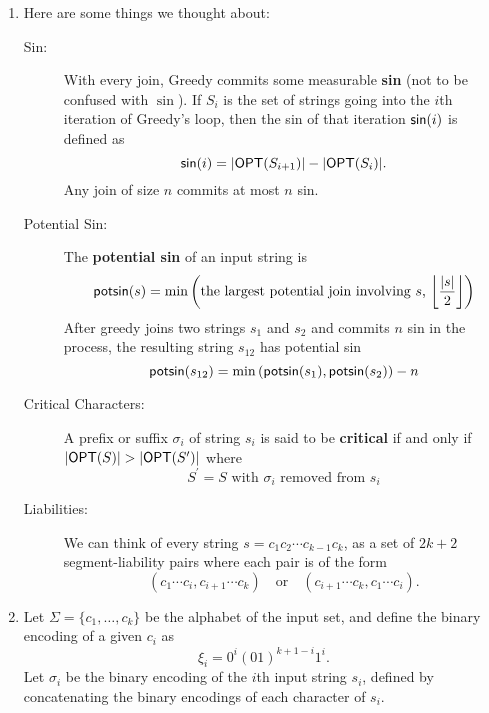 \documentclass{article}
\def\prm{^\prime}
\def\G{{\sf Greedy}\xspace}
\def\O{{\sf OPT}\xspace}
\begin{document}
\begin{enumerate}
\begin{enumerate}
\newpage
\item
Here are some things we thought about:
\begin{description}

\item[Sin:] With every join, \G commits some measurable {\bf sin} (not to be confused with $\sin$). If $S_i$ is the set of strings going into the $i$th iteration of \G's loop, then the sin of that iteration ${\sf sin}(i)$ is defined as
$${\sf sin}(i) = |\O(S_{i+1})| - |\O(S_i)|.$$
Any join of size $n$ commits at most $n$ sin.

\item[Potential Sin:] The {\bf potential sin} of an input string is
$${\sf potsin}(s) = \min\left(\text{the largest potential join involving $s$, $\left\lfloor\frac{|s|}{2}\right\rfloor$}\right)$$
After greedy joins two strings $s_1$ and $s_2$ and commits $n$ sin in the process, the resulting string $s_{12}$ has potential sin
$${\sf potsin}(s_{12}) = \min\left({\sf potsin}(s_1), {\sf potsin}(s_2)\right) - n$$

\item[Critical Characters:] A prefix or suffix $\sigma_i$ of string $s_i$ is said to be {\bf critical} if and only if $|\O(S)| > |\O(S\prm)|$ where
$$S\prm = \text{$S$ with $\sigma_i$ removed from $s_i$}$$

\item[Liabilities:] We can think of every string $s = c_1 c_2 \cdots c_{k-1} c_k$, as a set of $2k+2$ segment-liability pairs where each pair is of the form
$$(c_1 \cdots c_i, c_{i+1} \cdots c_k) \hspace{1em}\text{or}\hspace{1em} (c_{i+1} \cdots c_k, c_1 \cdots c_i).$$

\end{description}

\item
Let $\Sigma = \{ c_1, \ldots, c_k \}$ be the alphabet of the input set, and define the binary encoding of a given $c_i$ as
    $$\xi_i = 0^i (01)^{k+1-i} 1^i.$$
Let $\sigma_i$ be the binary encoding of the $i$th input string $s_i$, defined by concatenating the binary encodings of each character of $s_i$.


\end{enumerate}
\end{enumerate}
\end{document}
